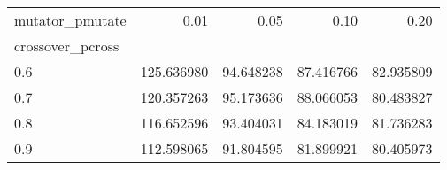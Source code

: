 \begin{tabular}{lrrrr}
\toprule
mutator\_pmutate &        0.01 &       0.05 &       0.10 &       0.20 \\
crossover\_pcross &             &            &            &            \\
\midrule
0.6              &  125.636980 &  94.648238 &  87.416766 &  82.935809 \\
0.7              &  120.357263 &  95.173636 &  88.066053 &  80.483827 \\
0.8              &  116.652596 &  93.404031 &  84.183019 &  81.736283 \\
0.9              &  112.598065 &  91.804595 &  81.899921 &  80.405973 \\
\bottomrule
\end{tabular}
